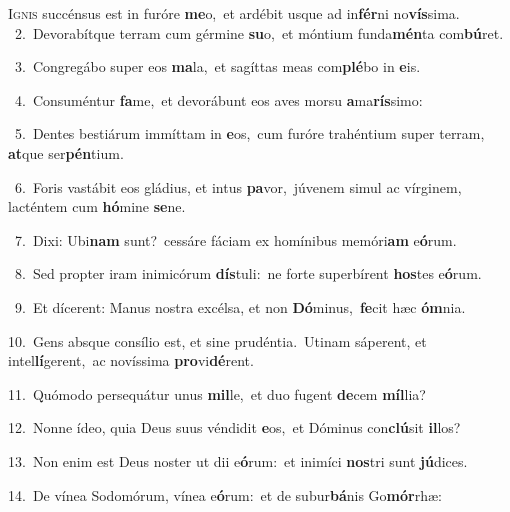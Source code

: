 \lettrine{\initial\textcolor{\initialcolor}{I}}{gnis} succénsus est in furóre \textbf{me}\-o,~\star et ardébit usque ad in\-\textbf{fér}\-ni no\-\textbf{vís}\-sima.\\
{\numbfont\textcolor{\numbcolor}{~2.}}~Devorabítque terram cum gérmine \textbf{su}\-o,~\star et móntium funda\-\textbf{mén}\-ta com\-\textbf{bú}\-ret.\par
{\numbfont\textcolor{\numbcolor}{~3.}}~Congregábo super eos \textbf{ma}\-la,~\star et sagíttas meas com\-\textbf{plé}\-bo in \textbf{e}\-is.\par
{\numbfont\textcolor{\numbcolor}{~4.}}~Consuméntur \textbf{fa}\-me,~\star et devorábunt eos aves morsu \textbf{a}\-ma\-\textbf{rís}\-simo:\par
{\numbfont\textcolor{\numbcolor}{~5.}}~Dentes bestiárum immíttam in \textbf{e}\-os,~\star cum furóre trahéntium super terram, \textbf{at}\-que ser\-\textbf{pén}\-tium.\par
{\numbfont\textcolor{\numbcolor}{~6.}}~Foris vastábit eos gládius, et intus \textbf{pa}\-vor,~\star júvenem simul ac vírginem, lacténtem cum \textbf{hó}\-mine \textbf{se}\-ne.\par
{\numbfont\textcolor{\numbcolor}{~7.}}~Dixi: Ubi\textbf{nam} sunt?~\star cessáre fáciam ex homínibus memóri\textbf{am} e\-\textbf{ó}\-rum.\par
{\numbfont\textcolor{\numbcolor}{~8.}}~Sed propter iram inimicórum \textbf{dís}\-tuli:~\star ne forte superbírent \textbf{hos}\-tes e\-\textbf{ó}\-rum.\par
{\numbfont\textcolor{\numbcolor}{~9.}}~Et dícerent: Manus nostra excélsa, et non \textbf{Dó}\-minus,~\star \textbf{fe}\-cit hæc \textbf{óm}\-nia.\par
{\numbfont\textcolor{\numbcolor}{10.}}~Gens absque consílio est, et sine prudéntia.~\dagger Utinam sáperent, et intel\-\textbf{lí}\-gerent,~\star ac novíssima \textbf{pro}\-vi\-\textbf{dé}\-rent.\par
{\numbfont\textcolor{\numbcolor}{11.}}~Quómodo persequátur unus \textbf{mil}\-le,~\star et duo fugent \textbf{de}\-cem \textbf{míl}\-lia?\par
{\numbfont\textcolor{\numbcolor}{12.}}~Nonne ídeo, quia Deus suus véndidit \textbf{e}\-os,~\star et Dóminus con\-\textbf{clú}\-sit \textbf{il}\-los?\par
{\numbfont\textcolor{\numbcolor}{13.}}~Non enim est Deus noster ut dii e\-\textbf{ó}\-rum:~\star et inimíci \textbf{nos}\-tri sunt \textbf{jú}\-dices.\par
{\numbfont\textcolor{\numbcolor}{14.}}~De vínea Sodomórum, vínea e\-\textbf{ó}\-rum:~\star et de subur\-\textbf{bá}\-nis Go\-\textbf{mór}\-rhæ:\par
